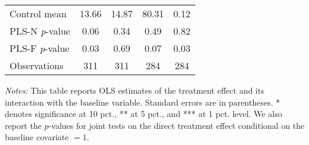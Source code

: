 \begin{table}[ht]
{\begin{threeparttable}
\begin{tabular}{l*{4}{c}}
Control mean    &    13.66         &    14.87         &    80.31         &     0.12         \\
PLS-N \emph{p}-value&     0.06         &     0.34         &     0.49         &     0.82         \\
PLS-F \emph{p}-value&     0.03         &     0.69         &     0.07         &     0.03         \\
Observations    &      311         &      311         &      284         &      284         \\
\bottomrule \end{tabular} \begin{tablenotes}[flushleft] \footnotesize \item \emph{Notes:} This table reports OLS estimates of the treatment effect and its interaction with the baseline variable. Standard errors are in parentheses. * denotes significance at 10 pct., ** at 5 pct., and *** at 1 pct. level. We also report the \(p\)-values for joint tests on the direct treatment effect conditional on the baseline covariate $= 1$. \end{tablenotes} \end{threeparttable} } \end{table}

